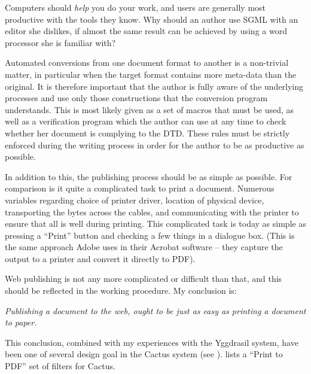 Computers should \textit{help} you do your work, and users are
generally most productive with the tools they know.  Why should an
author use SGML with an editor she dislikes, if almost the same result
can be achieved by using a word processor she is familiar with?

Automated conversions from one document format to another is a
non-trivial matter, in particular when the target format contains more
meta-data than the original.  It is therefore important that the
author is fully aware of the underlying processes and use only those
constructions that the conversion program understands.  This is most
likely given as a set of macros that must be used, as well as a
verification program which the author can use at any time to check
whether her document is complying to the DTD.  These rules must be
strictly enforced during the writing process in order for the author
to be as productive as possible.

In addition to this, the publishing process should be as simple as
possible.  For comparison is it quite a complicated task to print a
document.  Numerous variables regarding choice of printer driver,
location of physical device, transporting the bytes across the cables,
and communicating with the printer to ensure that all is well during
printing.  This complicated task is today as simple as pressing a
``Print'' button and checking a few things in a dialogue box. (This is
the same approach Adobe uses in their Acrobat software -- they capture
the output to a printer and convert it directly to PDF).

Web publishing is not any more complicated or difficult than that, and
this should be reflected in the working procedure.  My conclusion is:

\begin{center}
  \textit{Publishing a document to the web, ought to be just
    as easy as printing a document to paper.}
\end{center}

This conclusion, combined with my experiences with the Yggdrasil
system, have been one of several design goal in the Cactus system (see
).  
lists a ``Print to PDF'' set of filters for Cactus.




